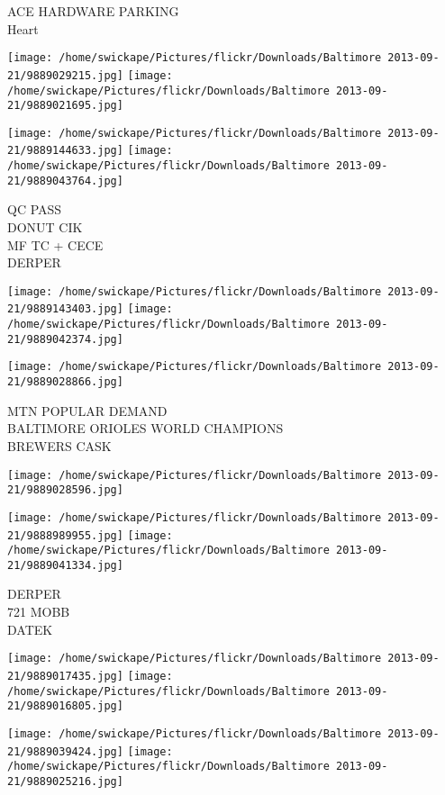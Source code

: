 \documentclass[10pt,letterpaper]{article}
\begin{document}
ACE HARDWARE PARKING\\
Heart\\
\pagebreak

\texttt{[image: /home/swickape/Pictures/flickr/Downloads/Baltimore 2013-09-21/9889029215.jpg]}
\texttt{[image: /home/swickape/Pictures/flickr/Downloads/Baltimore 2013-09-21/9889021695.jpg]}

\texttt{[image: /home/swickape/Pictures/flickr/Downloads/Baltimore 2013-09-21/9889144633.jpg]}
\texttt{[image: /home/swickape/Pictures/flickr/Downloads/Baltimore 2013-09-21/9889043764.jpg]}

QC PASS\\
DONUT CIK\\
MF TC + CECE\\
DERPER\\
\pagebreak

\texttt{[image: /home/swickape/Pictures/flickr/Downloads/Baltimore 2013-09-21/9889143403.jpg]}
\texttt{[image: /home/swickape/Pictures/flickr/Downloads/Baltimore 2013-09-21/9889042374.jpg]}

\texttt{[image: /home/swickape/Pictures/flickr/Downloads/Baltimore 2013-09-21/9889028866.jpg]}

MTN POPULAR DEMAND\\
BALTIMORE ORIOLES WORLD CHAMPIONS\\
BREWERS CASK\\
\pagebreak

\texttt{[image: /home/swickape/Pictures/flickr/Downloads/Baltimore 2013-09-21/9889028596.jpg]}

\vspace{0.25in}
\texttt{[image: /home/swickape/Pictures/flickr/Downloads/Baltimore 2013-09-21/9888989955.jpg]}
\texttt{[image: /home/swickape/Pictures/flickr/Downloads/Baltimore 2013-09-21/9889041334.jpg]}

DERPER\\
721 MOBB\\
DATEK\\
\pagebreak

\texttt{[image: /home/swickape/Pictures/flickr/Downloads/Baltimore 2013-09-21/9889017435.jpg]}
\texttt{[image: /home/swickape/Pictures/flickr/Downloads/Baltimore 2013-09-21/9889016805.jpg]}

\texttt{[image: /home/swickape/Pictures/flickr/Downloads/Baltimore 2013-09-21/9889039424.jpg]}
\texttt{[image: /home/swickape/Pictures/flickr/Downloads/Baltimore 2013-09-21/9889025216.jpg]}
\end{document}
